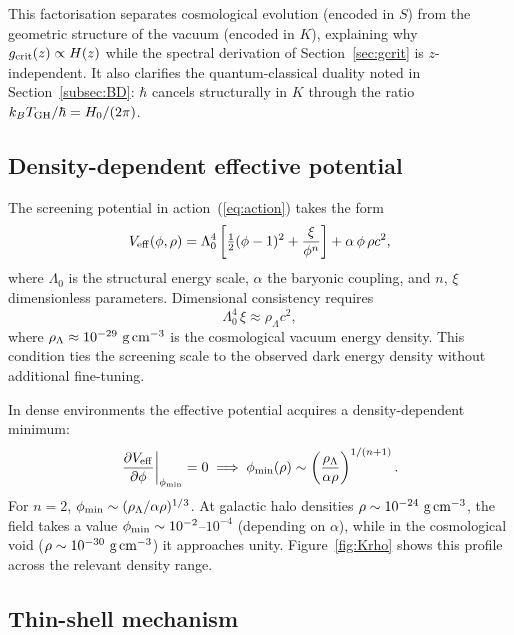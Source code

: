 \documentclass[11pt,a4paper]{article}
\begin{document}
This factorisation separates cosmological evolution (encoded in $S$) from the
geometric structure of the vacuum (encoded in $K$), explaining why
$g_{\rm crit}(z)\propto H(z)$ while the spectral derivation of Section~\ref{sec:gcrit}
is $z$-independent.  It also clarifies the quantum-classical duality noted
in Section~\ref{subsec:BD}: $\hbar$ cancels structurally in $K$ through the
ratio $k_BT_{\rm GH}/\hbar = H_0/(2\pi)$.


\subsection{Density-dependent effective potential}
\label{subsec:Veff}

The screening potential in action~(\ref{eq:action}) takes the form
\begin{equation}
  V_{\rm eff}(\phi,\rho) = \Lambda_0^4\left[\tfrac{1}{2}(\phi-1)^2 + \frac{\xi}{\phi^n}\right]
  + \alpha\,\phi\,\rho c^2,
  \label{eq:Veff}
\end{equation}
where $\Lambda_0$ is the structural energy scale, $\alpha$ the baryonic coupling, and
$n$, $\xi$ dimensionless parameters. Dimensional consistency requires
\begin{equation}
  \Lambda_0^4\,\xi \approx \rho_\Lambda c^2,
\end{equation}
where $\rho_\Lambda \approx 10^{-29}\ \text{g\,cm}^{-3}$ is the cosmological vacuum
energy density. This condition ties the screening scale to the observed dark energy
density without additional fine-tuning.

In dense environments the effective potential acquires a density-dependent minimum:
\begin{equation}
  \left.\frac{\partial V_{\rm eff}}{\partial\phi}\right|_{\phi_{\rm min}} = 0
  \implies
  \phi_{\rm min}(\rho) \sim \left(\frac{\rho_\Lambda}{\alpha\rho}\right)^{1/(n+1)}.
\end{equation}
For $n=2$, $\phi_{\rm min}\sim(\rho_\Lambda/\alpha\rho)^{1/3}$. At galactic halo
densities $\rho\sim10^{-24}\ \text{g\,cm}^{-3}$, the field takes a value
$\phi_{\rm min}\sim10^{-2}$--$10^{-4}$ (depending on $\alpha$), while in the
cosmological void ($\rho\sim10^{-30}\ \text{g\,cm}^{-3}$) it approaches unity.
Figure~\ref{fig:Krho} shows this profile across the relevant density range.

\subsection{Thin-shell mechanism}
\label{subsec:thinshell}
\end{document}
